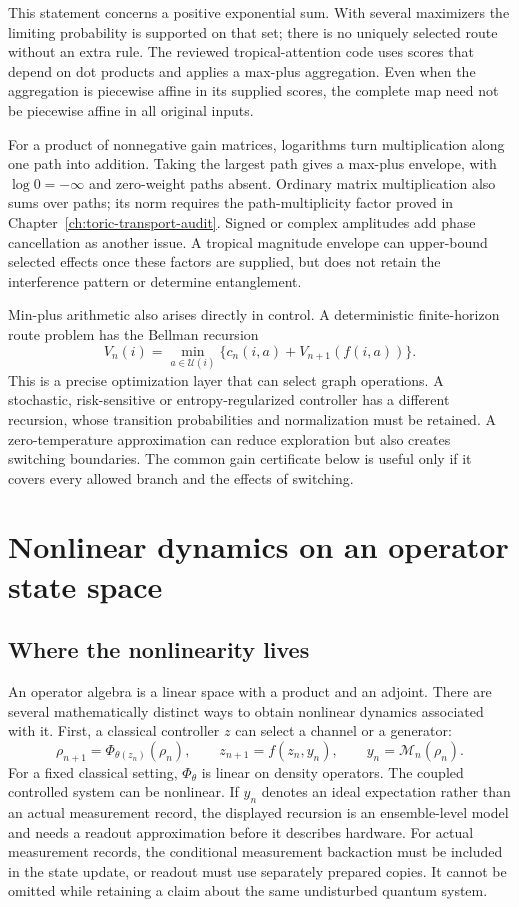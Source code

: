 This statement concerns a positive exponential sum. With several maximizers
the limiting probability is supported on that set; there is no uniquely
selected route without an extra rule. The reviewed tropical-attention code
uses scores that depend on dot products and applies a max-plus aggregation.
Even when the aggregation is piecewise affine in its supplied scores,
the complete map need not be piecewise affine in all original inputs.

For a product of nonnegative gain matrices, logarithms turn multiplication
along one path into addition. Taking the largest path gives a max-plus
envelope, with $\log0=-\infty$ and zero-weight paths absent. Ordinary
matrix multiplication also sums over paths; its norm
requires the path-multiplicity factor proved in
Chapter~\ref{ch:toric-transport-audit}. Signed or complex amplitudes add
phase cancellation as another issue. A tropical magnitude envelope can
upper-bound selected effects once these factors are supplied, but does not
retain the interference pattern or determine entanglement.

Min-plus arithmetic also arises directly in control. A deterministic
finite-horizon route problem has the Bellman recursion
\[
 V_n(i)=\min_{a\in\mathcal U(i)}
 \{c_n(i,a)+V_{n+1}(f(i,a))\}.
\]
This is a precise optimization layer that can select graph operations.
A stochastic, risk-sensitive or entropy-regularized controller has a
different recursion, whose transition probabilities and normalization must
be retained. A zero-temperature approximation can reduce exploration but
also creates switching boundaries. The common gain certificate below is
useful only if it covers every allowed branch and the effects of switching.

\section{Nonlinear dynamics on an operator state space}

\subsection{Where the nonlinearity lives}

An operator algebra is a linear space with a product and an adjoint. There
are several mathematically distinct ways to obtain nonlinear dynamics
associated with it. First, a classical controller $z$ can select a channel
or a generator:
\[
 \rho_{n+1}=\Phi_{\theta(z_n)}(\rho_n),\qquad
 z_{n+1}=f(z_n,y_n),\qquad
 y_n=\mathcal M_n(\rho_n).
\]
For a fixed classical setting, $\Phi_{\theta}$ is linear on density
operators. The coupled controlled system can be nonlinear. If $y_n$
denotes an ideal expectation rather than an actual measurement record,
the displayed recursion is an ensemble-level model and needs a readout
approximation before it describes hardware.
For actual measurement records, the conditional measurement backaction
must be included in the state update, or readout must use separately
prepared copies. It cannot be omitted while retaining a claim about the
same undisturbed quantum system.

